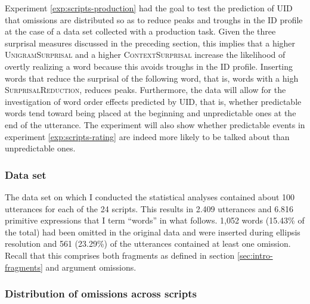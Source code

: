 Experiment \ref{exp:scripts-production} had the goal to test the prediction of UID that omissions are distributed so as to reduce peaks and troughs in the ID profile at the case of a data set collected with a production task. Given the three surprisal measures discussed in the preceding section, this implies that a higher \textsc{UnigramSurprisal} and a higher \textsc{ContextSurprisal} increase the likelihood of overtly realizing a word because this avoids troughs in the ID profile. Inserting words that reduce the surprisal of the following word, that is, words with a high \textsc{SurprisalReduction}, reduces peaks. Furthermore, the data will allow for the investigation of word order effects predicted by UID, that is, whether predictable words tend toward being placed at the beginning and unpredictable ones at the end of the utterance. The experiment will also show whether predictable events in experiment \ref{exp:scripts-rating} are indeed more likely to be talked about than unpredictable ones.


\subsubsection{Data set}
\label{sec:scripts-production-results-dataset}
The data set on which I conducted the statistical analyses contained about 100 utterances for each of the 24 scripts. This results in 2.409 utterances and 6.816 primitive expressions that I term ``words'' in what follows. 1,052 words (15.43\% of the total) had been omitted in the original data and were inserted during ellipsis resolution and 561 (23.29\%) of the utterances contained at least one omission. Recall that this comprises both fragments as defined in section \ref{sec:intro-fragments} and argument omissions.

\subsubsection{Distribution of omissions across scripts}

